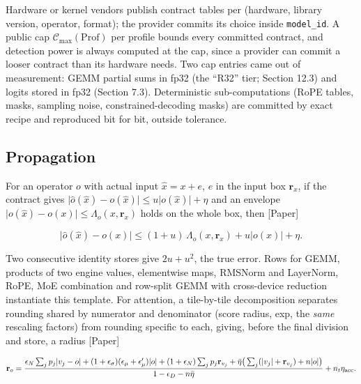 \documentclass[10pt]{article}
\begin{document}
Hardware or kernel vendors publish contract tables per (hardware, library version, operator, format); the provider commits its choice inside \texttt{model\_\allowbreak{}id}. A public cap $\mathcal C_{\max}(\mathrm{Prof})$ per profile bounds every committed contract, and detection power is always computed at the cap, since a provider can commit a looser contract than its hardware needs. Two cap entries came out of measurement: GEMM partial sums in fp32 (the ``R32'' tier; Section 12.3) and logits stored in fp32 (Section 7.3). Deterministic sub-computations (RoPE tables, masks, sampling noise, constrained-decoding masks) are committed by exact recipe and reproduced bit for bit, outside tolerance.

\subsection{Propagation}
For an operator $o$ with actual input $\hat x=x+e$, $e$ in the input box $\mathbf r_x$, if the contract gives $\lvert\hat o(\hat x)-o(\hat x)\rvert\le u\lvert o(\hat x)\rvert+\eta$ and an envelope $\lvert o(\hat x)-o(x)\rvert\le\Lambda_o(x,\mathbf r_x)$ holds on the whole box, then [Paper]

\[\lvert\hat o(\hat x)-o(x)\rvert\le(1+u)\,\Lambda_o(x,\mathbf r_x)+u\lvert o(x)\rvert+\eta .\]

Two consecutive identity stores give $2u+u^2$, the true error. Rows for GEMM, products of two engine values, elementwise maps, RMSNorm and LayerNorm, RoPE, MoE combination and row-split GEMM with cross-device reduction instantiate this template. For attention, a tile-by-tile decomposition separates rounding shared by numerator and denominator (score radius, exp, the \emph{same} rescaling factors) from rounding specific to each, giving, before the final division and store, a radius [Paper]

\[\mathbf r_o=\frac{\epsilon_N\sum_jp_j\lvert v_j-o\rvert+(1+\epsilon_\sigma)(\epsilon_\mu+\epsilon_\mu')\lvert o\rvert+(1+\epsilon_N)\sum_jp_j\mathbf r_{v_j}+\bar\eta\big(\sum_j(\lvert v_j\rvert+\mathbf r_{v_j})+n\lvert o\rvert\big)}{1-\epsilon_D-n\bar\eta}+n_t\eta_{\rm acc}.\]
\end{document}

